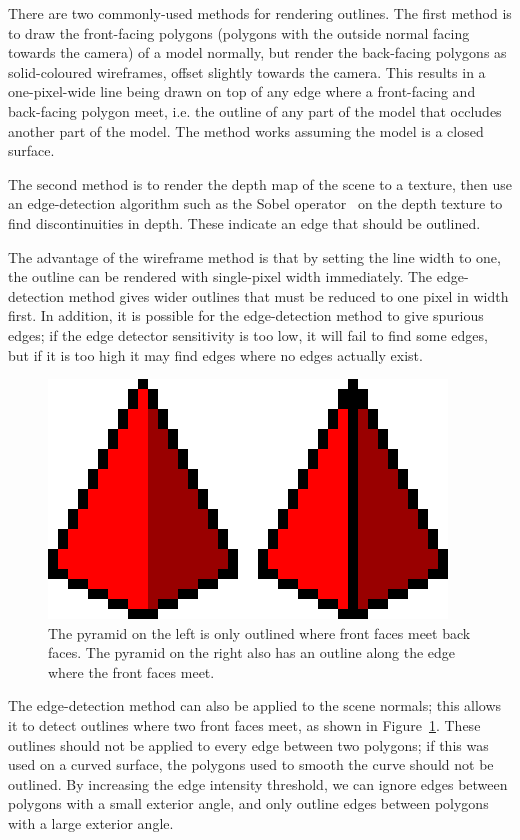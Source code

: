\documentclass[12pt,twoside,notitlepage]{report}
\begin{document}
There are two commonly-used methods for rendering outlines. The first method is to draw the front-facing polygons (polygons with the outside normal facing towards the camera) of a model normally, but render the back-facing polygons as solid-coloured wireframes, offset slightly towards the camera. This results in a one-pixel-wide line being drawn on top of any edge where a front-facing and back-facing polygon meet, i.e. the outline of any part of the model that occludes another part of the model. The method works assuming the model is a closed surface.

The second method is to render the depth map of the scene to a texture, then use an edge-detection algorithm such as the Sobel operator~\cite{Sobel1968} on the depth texture to find discontinuities in depth. These indicate an edge that should be outlined.

The advantage of the wireframe method is that by setting the line width to one, the outline can be rendered with single-pixel width immediately. The edge-detection method gives wider outlines that must be reduced to one pixel in width first. In addition, it is possible for the edge-detection method to give spurious edges; if the edge detector sensitivity is too low, it will fail to find some edges, but if it is too high it may find edges where no edges actually exist.

\begin{figure}[h!]
\centering
\includegraphics{interioroutline}
\caption{The pyramid on the left is only outlined where front faces meet back faces. The pyramid on the right also has an outline along the edge where the front faces meet.}
\label{fig:interiouroutline}
\end{figure}

The edge-detection method can also be applied to the scene normals; this allows it to detect outlines where two front faces meet, as shown in Figure~\ref{fig:interiouroutline}. These outlines should not be applied to every edge between two polygons; if this was used on a curved surface, the polygons used to smooth the curve should not be outlined. By increasing the edge intensity threshold, we can ignore edges between polygons with a small exterior angle, and only outline edges between polygons with a large exterior angle.
\end{document}
